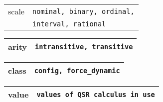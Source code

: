 \documentclass[10pt, a4paper]{article}
\begin{document}
\begin{table}[H]
\def\baselinestretch{1}
{\small
\begin{tabular}{|l|l|}
\hline
{\sc scale} & {\tt nominal, binary, ordinal,} \\
& {\tt interval, rational} \\
\hline
\end{tabular}
} 
\def\baselinestretch{1.9}
\end{table}

\begin{table}[H]
\def\baselinestretch{1}
{\small
\begin{tabular}{|l|l|}
\hline
{\sc arity} & {\tt intransitive, transitive} \\
\hline
\end{tabular}
} 
\def\baselinestretch{1.9}
\end{table}


\begin{table}[H]
\def\baselinestretch{1}
{\small
\begin{tabular}{|l|l|}
\hline
{\sc class} & {\tt config, force\_dynamic} \\
\hline
\end{tabular}
} 
\def\baselinestretch{1.9}
\end{table}

\begin{table}[H]
\def\baselinestretch{1}
{\small
\begin{tabular}{|l|l|}
\hline
{\sc value} & {\tt values of QSR calculus in use} \\
\hline
\end{tabular}
} 
\def\baselinestretch{1.9}
\end{table}
\end{document}
